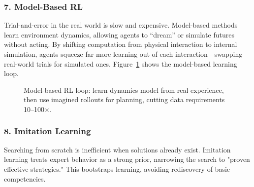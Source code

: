 \documentclass[12pt,a4paper]{report}
\theoremstyle{definition}
\begin{document}
\subsubsection*{7. Model-Based RL}
Trial-and-error in the real world is slow and expensive. Model-based methods learn environment dynamics, allowing agents to ``dream'' or simulate futures without acting. By shifting computation from physical interaction to internal simulation, agents squeeze far more learning out of each interaction---swapping real-world trials for simulated ones. Figure~\ref{fig:model_based} shows the model-based learning loop.

\begin{figure}[htbp]
\centering
{}
\caption{Model-based RL loop: learn dynamics model from real experience, then use imagined rollouts for planning, cutting data requirements 10--100$\times$.}
\label{fig:model_based}
\end{figure}

\subsubsection*{8. Imitation Learning}
Searching from scratch is inefficient when solutions already exist. Imitation learning treats expert behavior as a strong prior, narrowing the search to "proven effective strategies." This bootstraps learning, avoiding rediscovery of basic competencies.
\end{document}
